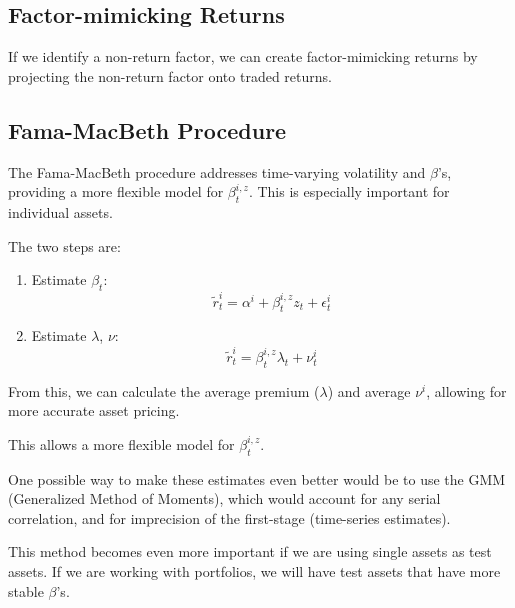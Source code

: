 \documentclass{article}
\begin{document}
\subsection{Factor-mimicking Returns}
If we identify a non-return factor, we can create factor-mimicking returns by projecting the non-return factor onto traded returns.

\subsection{Fama-MacBeth Procedure}
The Fama-MacBeth procedure addresses time-varying volatility and \( \beta \)'s, providing a more flexible model for \( \beta^{i, z}_t \). This is especially important for individual assets.

The two steps are:
\begin{enumerate}
    \item Estimate \( \beta_t \):
    \[
    \tilde{r}_t^i = \alpha^i + \beta_t^{i, z} z_t + \epsilon^i_t
    \]
    \item Estimate \( \lambda \), \( \nu \):
    \[
    \tilde{r}_t^i = \beta_t^{i, z} \lambda_t + \nu^i_t
    \]
\end{enumerate}

From this, we can calculate the average premium (\( \lambda \)) and average \( \nu^i \), allowing for more accurate asset pricing.

This allows a more flexible model for \( \beta^{i, z}_t \).

One possible way to make these estimates even better would be to use the GMM (Generalized Method of Moments), which would account for any serial correlation, and for imprecision of the first-stage (time-series estimates).

This method becomes even more important if we are using single assets as test assets. If we are working with portfolios, we will have test assets that have more stable \( \beta \)'s.
\end{document}
